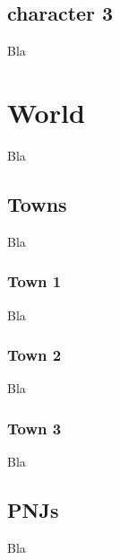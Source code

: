 \documentclass[a4paper,12pt]{book}
\begin{document}
\section{character 3}
Bla
\chapter{World}
Bla
\section{Towns}
Bla
\subsection{Town 1}
Bla
\subsection{Town 2}
Bla
\subsection{Town 3}
Bla
\section{PNJs}
Bla
\end{document}
